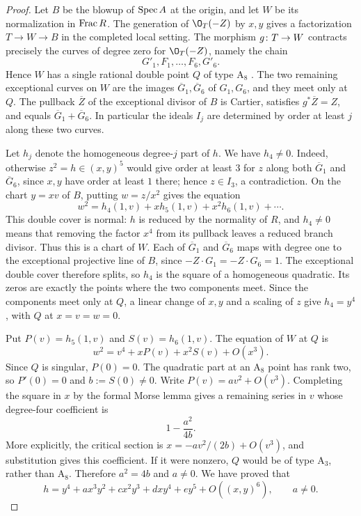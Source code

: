\begin{proof}
Let $B$ be the blowup of $\operatorname{Spec} A$ at the origin, and let $W$ be its normalization in $\operatorname{Frac} R$.
The generation of $\O_T(-Z)$ by $x,y$ gives a factorization $T\to W\to B$ in the completed local setting.
The morphism $g\colon T\to W$ contracts precisely the curves of degree zero for $\O_T(-Z)$, namely the chain
\[
  G'_1,F_1,\ldots,F_6,G'_6.
\]
Hence $W$ has a single rational double point $Q$ of type $\mathrm A_8$ \cite{Art77}.
The two remaining exceptional curves on $W$ are the images $\overline G_1,\overline G_6$ of $G_1,G_6$, and they meet only at $Q$.
The pullback $\overline Z$ of the exceptional divisor of $B$ is Cartier, satisfies $g^*\overline Z = Z$, and equals $\overline G_1+\overline G_6$.
In particular the ideals $I_j$ are determined by order at least $j$ along these two curves.

Let $h_j$ denote the homogeneous degree-$j$ part of $h$.
We have $h_4\neq 0$.
Indeed, otherwise $z^2=h\in(x,y)^5$ would give order at least $3$ for $z$ along both $\overline G_1$ and $\overline G_6$, since $x,y$ have order at least $1$ there; hence $z\in I_3$, a contradiction.
On the chart $y=xv$ of $B$, putting $w=z/x^2$ gives the equation
\[
  w^2 = h_4(1,v)+xh_5(1,v)+x^2h_6(1,v)+\cdots.
\]
This double cover is normal: $h$ is reduced by the normality of $R$, and $h_4\neq 0$ means that removing the factor $x^4$ from its pullback leaves a reduced branch divisor.
Thus this is a chart of $W$.
Each of $\overline G_1$ and $\overline G_6$ maps with degree one to the exceptional projective line of $B$, since $-Z\cdot G_1 = -Z\cdot G_6 = 1$.
The exceptional double cover therefore splits, so $h_4$ is the square of a homogeneous quadratic.
Its zeros are exactly the points where the two components meet.
Since the components meet only at $Q$, a linear change of $x,y$ and a scaling of $z$ give $h_4 = y^4$, with $Q$ at $x=v=w=0$.

Put $P(v) = h_5(1,v)$ and $S(v) = h_6(1,v)$.
The equation of $W$ at $Q$ is
\[
  w^2 = v^4+xP(v)+x^2S(v)+O(x^3).
\]
Since $Q$ is singular, $P(0) = 0$.
The quadratic part at an $\mathrm A_8$ point has rank two, so $P'(0) = 0$ and $b := S(0)\neq 0$.
Write $P(v) = av^2+O(v^3)$.
Completing the square in $x$ by the formal Morse lemma gives a remaining series in $v$ whose degree-four coefficient is
\[
  1-\frac{a^2}{4b}.
\]
More explicitly, the critical section is $x = -a v^2/(2b)+O(v^3)$, and substitution gives this coefficient.
If it were nonzero, $Q$ would be of type $\mathrm A_3$, rather than $\mathrm A_8$.
Therefore $a^2 = 4b$ and $a\neq 0$.
We have proved that
\[
  h = y^4+ax^3y^2+cx^2y^3+dxy^4+ey^5+O((x,y)^6),
  \qquad a\neq 0.
\]


\end{proof}
